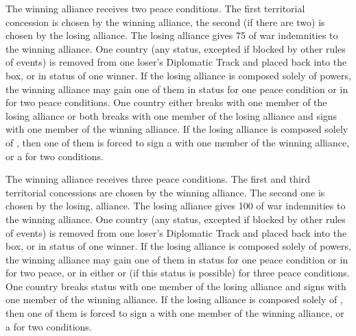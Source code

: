  The winning alliance receives two peace conditions.
 The first territorial concession is chosen by
the winning alliance, the second (if there are two) is chosen by the losing
alliance.
\bparag[Indemnities] The losing alliance gives 75 \ducats of war indemnities
to the winning alliance.
 One country (any status, excepted if blocked
by other rules of events) is removed from one loser's Diplomatic Track and
placed back into the \Neutral box, or in \MR status of one winner. If the
losing alliance is composed solely of \MIN powers, the winning alliance may
gain one of them in \MR status for one peace condition or in \AM for two peace
conditions.
 One \ROTW country either breaks \dipAT
with one member of the losing alliance or both breaks \dipFR with one member
of the losing alliance and signs \dipFR with one member of the winning
alliance. If the losing alliance is composed solely of \MIN, then one of them
is forced to sign a \dipFR with one member of the winning alliance, or a
\dipAT for two conditions.

 The winning alliance receives three peace
conditions.
 The first and third territorial concessions
are chosen by the winning alliance. The second one is chosen by the losing,
alliance.
\bparag[Indemnities] The losing alliance gives 100 \ducats of war indemnities
to the winning alliance.
 One country (any status, excepted if blocked
by other rules of events) is removed from one loser's Diplomatic Track and
placed back into the \Neutral box, or in \MR status of one winner. If the
losing alliance is composed solely of \MIN powers, the winning alliance may
gain one of them in \MR status for one peace condition or in \AM for two
peace, or in either \EG or \VASSAL (if this status is possible) for three
peace conditions.
 One \ROTW country breaks status with one
member of the losing alliance and signs \dipFR with one member of the winning
alliance. If the losing alliance is composed solely of \MIN, then one of them
is forced to sign a \dipFR with one member of the winning alliance, or a
\dipAT for two conditions.

